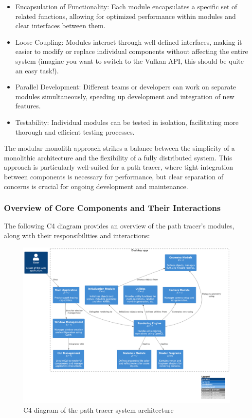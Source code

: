 \documentclass[12pt]{article}
\begin{document}
\begin{itemize}
    \item Encapsulation of Functionality: Each module encapsulates a specific set of related functions, allowing for optimized performance within modules and clear interfaces between them.
    \item Loose Coupling: Modules interact through well-defined interfaces, making it easier to modify or replace individual components without affecting the entire system (imagine you want to switch to the Vulkan API, this should be quite an easy task!).
    \item Parallel Development: Different teams or developers can work on separate modules simultaneously, speeding up development and integration of new features.
    \item Testability: Individual modules can be tested in isolation, facilitating more thorough and efficient testing processes.
\end{itemize}

The modular monolith approach strikes a balance between the simplicity of a monolithic architecture and the flexibility of a fully distributed system. This approach is particularly well-suited for a path tracer, where tight integration between components is necessary for performance, but clear separation of concerns is crucial for ongoing development and maintenance.

\subsubsection{Overview of Core Components and Their Interactions}

The following C4 diagram provides an overview of the path tracer's modules, along with their responsibilities and interactions:

\begin{figure}[H]
    \centering
    \includegraphics[width=\textwidth]{images/lumi_pml.png}
    \caption{C4 diagram of the path tracer system architecture}
    \label{fig:c4-diagram}
\end{figure}
\end{document}

